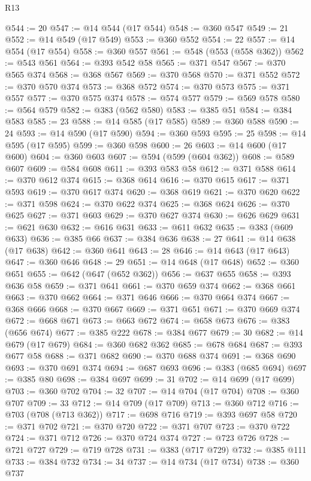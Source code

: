\begin{lexlean}{R13}
\begin{coremodule}
{{{{{{{{{{{{{{{{{{{{{{{{{{{{{{{{{{{{{{{{{{{{{{{{{{{{{{@544 := 20
@547 := @14 @544 (@17 @544)
@548 := @360 @547
@549 := 21
@552 := @14 @549 (@17 @549)
@553 := @360 @552
@554 := 22
@557 := @14 @554 (@17 @554)
@558 := @360 @557
@561 := @548 (@553 (@558 @362))
@562 := @543 @561
@564 := @393 @542 @58
@565 := @371 @547
@567 := @370 @565 @374
@568 := @368 @567
@569 := @370 @568
@570 := @371 @552
@572 := @370 @570 @374
@573 := @368 @572
@574 := @370 @573
@575 := @371 @557
@577 := @370 @575 @374
@578 := @574 @577
@579 := @569 @578
@580 := @564 @579
@582 := @383 (@562 @580)
@583 := @385 @51
@584 := @384 @583
@585 := 23
@588 := @14 @585 (@17 @585)
@589 := @360 @588
@590 := 24
@593 := @14 @590 (@17 @590)
@594 := @360 @593
@595 := 25
@598 := @14 @595 (@17 @595)
@599 := @360 @598
@600 := 26
@603 := @14 @600 (@17 @600)
@604 := @360 @603
@607 := @594 (@599 (@604 @362))
@608 := @589 @607
@609 := @584 @608
@611 := @393 @583 @58
@612 := @371 @588
@614 := @370 @612 @374
@615 := @368 @614
@616 := @370 @615
@617 := @371 @593
@619 := @370 @617 @374
@620 := @368 @619
@621 := @370 @620
@622 := @371 @598
@624 := @370 @622 @374
@625 := @368 @624
@626 := @370 @625
@627 := @371 @603
@629 := @370 @627 @374
@630 := @626 @629
@631 := @621 @630
@632 := @616 @631
@633 := @611 @632
@635 := @383 (@609 @633)
@636 := @385 @66
@637 := @384 @636
@638 := 27
@641 := @14 @638 (@17 @638)
@642 := @360 @641
@643 := 28
@646 := @14 @643 (@17 @643)
@647 := @360 @646
@648 := 29
@651 := @14 @648 (@17 @648)
@652 := @360 @651
@655 := @642 (@647 (@652 @362))
@656 := @637 @655
@658 := @393 @636 @58
@659 := @371 @641
@661 := @370 @659 @374
@662 := @368 @661
@663 := @370 @662
@664 := @371 @646
@666 := @370 @664 @374
@667 := @368 @666
@668 := @370 @667
@669 := @371 @651
@671 := @370 @669 @374
@672 := @668 @671
@673 := @663 @672
@674 := @658 @673
@676 := @383 (@656 @674)
@677 := @385 @222
@678 := @384 @677
@679 := 30
@682 := @14 @679 (@17 @679)
@684 := @360 @682 @362
@685 := @678 @684
@687 := @393 @677 @58
@688 := @371 @682
@690 := @370 @688 @374
@691 := @368 @690
@693 := @370 @691 @374
@694 := @687 @693
@696 := @383 (@685 @694)
@697 := @385 @80
@698 := @384 @697
@699 := 31
@702 := @14 @699 (@17 @699)
@703 := @360 @702
@704 := 32
@707 := @14 @704 (@17 @704)
@708 := @360 @707
@709 := 33
@712 := @14 @709 (@17 @709)
@713 := @360 @712
@716 := @703 (@708 (@713 @362))
@717 := @698 @716
@719 := @393 @697 @58
@720 := @371 @702
@721 := @370 @720
@722 := @371 @707
@723 := @370 @722
@724 := @371 @712
@726 := @370 @724 @374
@727 := @723 @726
@728 := @721 @727
@729 := @719 @728
@731 := @383 (@717 @729)
@732 := @385 @111
@733 := @384 @732
@734 := 34
@737 := @14 @734 (@17 @734)
@738 := @360 @737
}}}}}}}}}}}}}}}}}}}}}}}}}}}}}}}}}}}}}}}}}}}}}}}}}}}}}}
\end{coremodule}
\end{lexlean}
